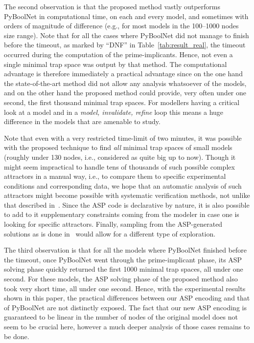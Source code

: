 \documentclass[preprint,12pt]{elsarticle}
\begin{document}
The second observation is that the proposed method vastly outperforms PyBoolNet in computational time, on each and every model, and sometimes with orders of magnitude of difference (e.g., for most models in the 100--1000 nodes size range).
Note that for all the cases where PyBoolNet did not manage to finish before the timeout, as marked by ``DNF'' in Table~\ref{tab:result_real}, the timeout occurred during the computation of the prime-implicants.
Hence, not even a single minimal trap space was output by that method.
The computational advantage is therefore immediately a practical advantage since on the one hand the state-of-the-art method did not allow any analysis whatsoever of the models, and on the other hand the proposed method could provide, very often under one second, the first thousand minimal trap spaces.
For modellers having a critical look at a model and in a \emph{model, invalidate, refine} loop this means a huge difference in the models that are amenable to study.

Note that even with a very restricted time-limit of two minutes, it was possible with the proposed technique to find \emph{all} minimal trap spaces of small models (roughly under 130 nodes, i.e., considered as quite big up to now).
Though it might seem impractical to handle tens of thousands of such possible complex attractors in a manual way, i.e., to compare them to specific experimental conditions and corresponding data, we hope that an automatic analysis of such attractors might become possible with systematic verification methods, not unlike that described in~\cite{hernandez2020computational}.
Since the ASP code is declarative by nature, it is also possible to add to it supplementary constraints coming from the modeler in case one is looking for specific attractors.
Finally, sampling from the ASP-generated solutions as is done in~\cite{chevalier2020synthesis} would allow for a different type of exploration.

The third observation is that for all the models where PyBoolNet finished before the timeout, once PyBoolNet went through the prime-implicant phase, its ASP solving phase quickly returned the first 1000 minimal trap spaces, all under one second.
For these models, the ASP solving phase of the proposed method also took very short time, all under one second.
Hence, with the experimental results shown in this paper, the practical differences between our ASP encoding and that of PyBoolNet are not distinctly exposed.
The fact that our new ASP encoding is guaranteed to be linear in the number of nodes of the original model does not seem to be crucial here, however a much deeper analysis of those cases remains to be done.
\end{document}
